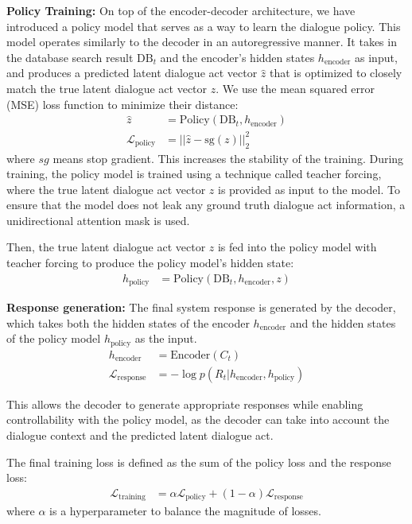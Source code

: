 \hfill

\textbf{Policy Training:} On top of the encoder-decoder architecture, we have introduced a policy model that serves as a way to learn the dialogue policy. 
This model operates similarly to the decoder in an autoregressive manner.
It takes in the database search result $\text{DB}_t$ and the encoder's hidden states $h_\text{encoder}$ as input, and produces a predicted latent dialogue act vector $\hat{z}$ that is optimized to closely match the true latent dialogue act vector $z$.
We use the mean squared error (MSE) loss function to minimize their distance:
\begin{align}
     \hat{z} &= \text{Policy} ( \text{DB}_t, h_\text{encoder}) \\
  \mathcal{L}_{\text{policy}} &= || \hat{z}  - \text{sg}(z) ||_2^2
\end{align}
where $sg$ means stop gradient. This increases the stability of the training. 
During training, the policy model is trained using a technique called teacher forcing, where the true latent dialogue act vector $z$ is provided as input to the model. 
To ensure that the model does not leak any ground truth dialogue act information, a unidirectional attention mask is used.

Then, the true latent dialogue act vector $z$ is fed into the policy model with teacher forcing to produce the policy model's hidden state:
\begin{align}
     h_\text{policy} &= \text{Policy} ( \text{DB}_t, h_\text{encoder}, z)
\end{align}

\textbf{Response generation:} The final system response is generated by the decoder, which takes both the hidden states of the encoder $h_\text{encoder}$ and the hidden states of the policy model $h_\text{policy}$ as the input.
\begin{align}
    h_\text{encoder} &= \text{Encoder} ( C_t) \\
    \mathcal{L}_{\text{response}} &= - \log p(R_t | h_\text{encoder}, h_\text{policy})
\end{align}

This allows the decoder to generate appropriate responses while enabling controllability with the policy model, as the decoder can take into account the dialogue context and the predicted latent dialogue act. 

The final training loss is defined as the sum of the policy loss and the response loss: 
\begin{align}
    \mathcal{L}_\text{training} &= \alpha \mathcal{L}_{\text{policy}} + (1- \alpha)\mathcal{L}_{\text{response}} 
\end{align}
where $\alpha$ is a hyperparameter to balance the magnitude of losses.

